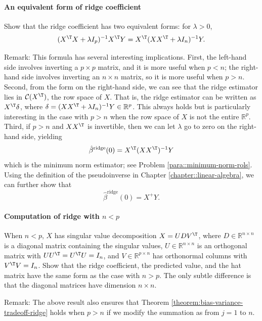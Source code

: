 \paragraph{An equivalent form of ridge coefficient}\label{hw13::ridge-equiv-computation}

Show that the ridge coefficient has two equivalent forms: for $\lambda > 0$, 
$$
(X^{\T}X+\lambda I_{p})^{-1}X^{\T}Y = X^{\T} (XX^{\T} + \lambda I_n)^{-1} Y.
$$
 


Remark: This formula has several interesting implications. First, the left-hand side involves inverting a $p\times p$ matrix, and it is more useful when $p<n$; the right-hand side involves inverting an $n\times n$ matrix, so it is more useful when $p>n$. 
Second, from the form on the right-hand side, we can see that the ridge estimator lies in $\mathcal{C}(X^{\T})$, the row space of $X$. That is, the ridge estimator can be written as $X^{\T} \delta $, where $\delta = (XX^{\T} + \lambda I_n)^{-1} Y \in \mathbb{R}^{p}$. This always holds but is particularly interesting in the case with $p>n$ when the row space of $X$ is not the entire $\mathbb{R}^{p}$. 
Third, if $p>n$ and $XX^{\T}$ is invertible, then we can let $\lambda$ go to zero on the right-hand side, yielding
$$
\hat{\beta}^{\text{ridge}}(0) = X^{\T} (XX^{\T}  )^{-1} Y
$$
 which is the minimum norm estimator; see Problem \ref{para::minimum-norm-rols}. Using the definition of the pseudoinverse in Chapter \ref{chapter::linear-algebra}, we can further show that
 $$
 \hat{\beta}^{\text{ridge}}(0) = X^{+} Y. 
 $$
 


\paragraph{Computation of ridge with $n<p$}\label{hw13::compute-ridge-large-p}
When $n<p$, $X$ has singular value decomposition $X = U D V^{\T}$, where $D \in \mathbb{R}^{n\times n}$ is a diagonal matrix containing the singular values, $U\in \mathbb{R}^{n\times n}$ is an orthogonal matrix with $UU^{\T} = U^{\T} U = I_n$, and $V \in \mathbb{R}^{p\times n}$ has orthonormal columns with $V^{\T} V = I_n$. Show that the ridge coefficient, the predicted value, and the hat matrix have the same form as the case with $n>p$.  The only subtle difference is that the diagonal matrices have dimension $n\times n$. 

Remark: The above result also ensures that Theorem \ref{theorem:bias-variance-tradeoff-ridge} holds when $p > n$ if we modify the summation as from $j=1$ to $n$. 






